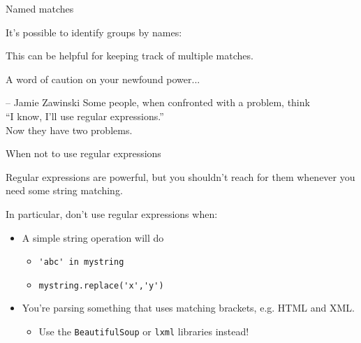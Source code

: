 \documentclass{beamer}
\begin{document}
\begin{frame}{Named matches}

It's possible to identify groups by names:



This can be helpful for keeping track of multiple matches.

\end{frame}

  
\begin{frame}{A word of caution on your newfound power...}

\begin{aquote}{-- Jamie Zawinski}
Some people, when confronted with a problem, think \\ ``I know, I'll use regular expressions.'' \\ Now they have two problems. \newline \newline
\end{aquote}

\end{frame}

\begin{frame}{When not to use regular expressions}

Regular expressions are powerful, but you shouldn't reach for them whenever you need some string matching.

\bigskip

In particular, don't use regular expressions when:
\begin{itemize}
 \item A simple string operation will do
	\begin{itemize} 
      \item \lstinline$'abc' in mystring$
      \item \lstinline$mystring.replace('x','y')$
    \end{itemize}
 \item You're parsing something that uses matching brackets, e.g. HTML and XML.
   \begin{itemize}
     \item Use the \lstinline$BeautifulSoup$ or \lstinline$lxml$ libraries instead!
   \end{itemize}
\end{itemize}

\end{frame}
\end{document}
